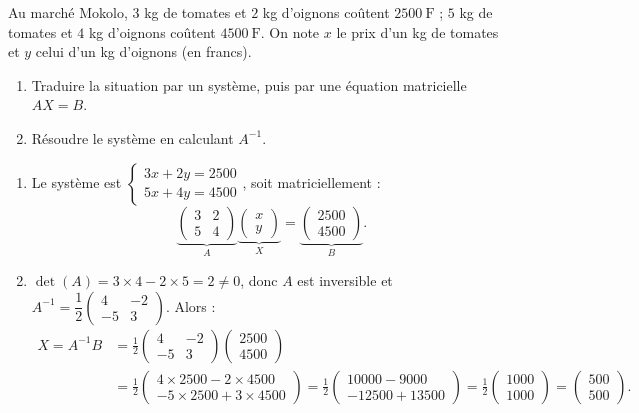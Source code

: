 \documentclass[11pt]{article}
\begin{document}
\begin{exoresolu}
Au marché Mokolo, $3$ kg de tomates et $2$ kg d'oignons coûtent $\SI{2500}{\text{F}}$ ; $5$ kg de tomates et $4$ kg d'oignons coûtent $\SI{4500}{\text{F}}$. On note $x$ le prix d'un kg de tomates et $y$ celui d'un kg d'oignons (en francs).
\begin{enumerate}
\item Traduire la situation par un système, puis par une équation matricielle $AX=B$.
\item Résoudre le système en calculant $A^{-1}$.
\end{enumerate}
\tcblower
\begin{enumerate}
\item Le système est $\begin{cases} 3x+2y=2500 \\ 5x+4y=4500 \end{cases}$, soit matriciellement :
\[ \underbrace{\begin{pmatrix} 3 & 2 \\ 5 & 4 \end{pmatrix}}_{A}\underbrace{\begin{pmatrix} x \\ y \end{pmatrix}}_{X}=\underbrace{\begin{pmatrix} 2500 \\ 4500 \end{pmatrix}}_{B}. \]
\item $\det(A)=3\times 4-2\times 5=2\neq 0$, donc $A$ est inversible et $A^{-1}=\dfrac{1}{2}\begin{pmatrix} 4 & -2 \\ -5 & 3 \end{pmatrix}$. Alors :
\begin{align*}
X=A^{-1}B&=\frac{1}{2}\begin{pmatrix} 4 & -2 \\ -5 & 3 \end{pmatrix}\begin{pmatrix} 2500 \\ 4500 \end{pmatrix}\\
&=\frac{1}{2}\begin{pmatrix} 4\times 2500-2\times 4500 \\ -5\times 2500+3\times 4500 \end{pmatrix}=\frac{1}{2}\begin{pmatrix} 10000-9000 \\ -12500+13500 \end{pmatrix}=\frac{1}{2}\begin{pmatrix} 1000 \\ 1000 \end{pmatrix}=\begin{pmatrix} 500 \\ 500 \end{pmatrix}.

\end{align*}
\end{enumerate}
\end{exoresolu}
\end{document}
